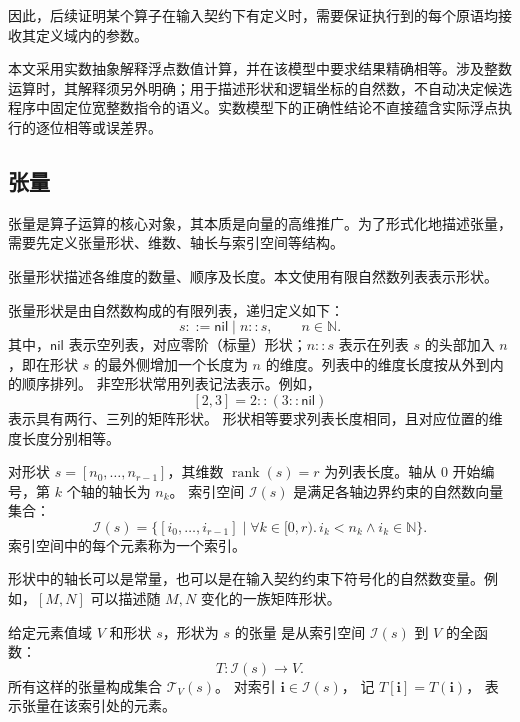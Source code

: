 因此，后续证明某个算子在输入契约下有定义时，需要保证执行到的每个原语均接收其定义域内的参数。

本文采用实数抽象解释浮点数值计算，并在该模型中要求结果精确相等。涉及整数运算时，其解释须另外明确；用于描述形状和逻辑坐标的自然数，不自动决定候选程序中固定位宽整数指令的语义。实数模型下的正确性结论不直接蕴含实际浮点执行的逐位相等或误差界。

\subsection{张量}
\label{subsec:tensors}

张量是算子运算的核心对象，其本质是向量的高维推广。为了形式化地描述张量，需要先定义张量形状、维数、轴长与索引空间等结构。

张量形状描述各维度的数量、顺序及长度。本文使用有限自然数列表表示形状。

\begin{definition}[形状]
\label{def:shape}
张量形状是由自然数构成的有限列表，递归定义如下：
\[
s \mathrel{::=} \mathsf{nil} \mid n::s,
\qquad n\in\mathbb N.
\]其中，\(\mathsf{nil}\) 表示空列表，对应零阶（标量）形状；\(n::s\) 表示在列表 \(s\) 的头部加入 \(n\)，即在形状 \(s\) 的最外侧增加一个长度为 \(n\) 的维度。列表中的维度长度按从外到内的顺序排列。
非空形状常用列表记法表示。例如，
\[
[2,3]=2::(3::\mathsf{nil})
\]
表示具有两行、三列的矩阵形状。
形状相等要求列表长度相同，且对应位置的维度长度分别相等。
\end{definition}

\begin{definition}
\label{def:rank-axis-length-and-index-space}
对形状 \(s = [n_0,\ldots,n_{r-1}]\)，其维数 \(\operatorname{rank}(s) = r\) 为列表长度。轴从 \(0\) 开始编号，第 \(k\) 个轴的轴长为 \(n_k\)。
索引空间 \(\mathcal I(s)\) 是满足各轴边界约束的自然数向量集合：
\[
\mathcal I(s) = \{[i_0,\ldots,i_{r-1}] \mid \forall k \in [0, r).\, i_k < n_k \land i_k \in \mathbb N\}.
\]
索引空间中的每个元素称为一个索引。
\end{definition}

形状中的轴长可以是常量，也可以是在输入契约约束下符号化的自然数变量。例如，\([M,N]\) 可以描述随 \(M,N\) 变化的一族矩阵形状。

\begin{definition}[张量]
\label{def:tensor}
  给定元素值域 \(V\) 和形状 \(s\)，形状为 \(s\) 的张量
  是从索引空间 \(\mathcal I(s)\) 到 \(V\) 的全函数：
  \[
    T:\mathcal I(s)\to V.
  \]
  所有这样的张量构成集合 \(\mathcal T_V(s)\)。
  对索引 \(\boldsymbol i\in\mathcal I(s)\)，
  记 \(T[\boldsymbol i]=T(\boldsymbol i)\)，
  表示张量在该索引处的元素。
\end{definition}

